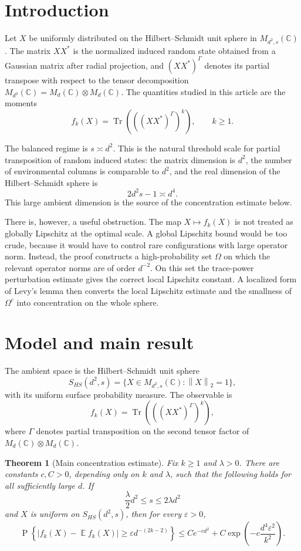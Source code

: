 \documentclass[11pt,reqno]{amsart}
\newtheorem{theorem}{Theorem}[section]
\newcommand{\norm}[1]{\left\lVert#1\right\rVert}
\def\C{\mathbb{C}}
\DeclareMathOperator{\Tr}{Tr}
\DeclareMathOperator{\E}{\mathbb{E}}
\DeclareMathOperator{\Prob}{P}
\newenvironment{revderived}{\begingroup\color{RevisionDerived}}{\endgroup}
\begin{document}
\begin{revderived}
\section{Introduction}

Let \(X\) be uniformly distributed on the Hilbert--Schmidt unit sphere in
\(M_{d^2,s}(\C)\).  The matrix \(XX^*\) is the normalized induced random
state obtained from a Gaussian matrix after radial projection, and
\((XX^*)^\Gamma\) denotes its partial transpose with respect to the tensor
decomposition \(M_{d^2}(\C)=M_d(\C)\otimes M_d(\C)\).  The quantities studied
in this article are the moments
\[
  f_k(X)=\Tr\left(((XX^*)^\Gamma)^k\right),
  \qquad k\ge1.
\]

The balanced regime is \(s\asymp d^2\).  This is the natural threshold scale
for partial transposition of random induced states: the matrix dimension is
\(d^2\), the number of environmental columns is comparable to \(d^2\), and the
real dimension of the Hilbert--Schmidt sphere is
\[
  2d^2s-1\asymp d^4.
\]
This large ambient dimension is the source of the concentration estimate
below.

There is, however, a useful obstruction.  The map \(X\mapsto f_k(X)\) is not
treated as globally Lipschitz at the optimal scale.  A global Lipschitz bound
would be too crude, because it would have to control rare configurations with
large operator norm.  Instead, the proof constructs a high-probability set
\(\Omega\) on which the relevant operator norms are of order \(d^{-2}\).  On
this set the trace-power perturbation estimate gives the correct local
Lipschitz constant.  A localized form of Levy's lemma then converts the local
Lipschitz estimate and the smallness of \(\Omega^c\) into concentration on the
whole sphere.

\section{Model and main result}

The ambient space is the Hilbert--Schmidt unit sphere
\[
  S_{HS}(d^2,s)
  =
  \{X\in M_{d^2,s}(\C):\norm X_2=1\},
\]
with its uniform surface probability measure.  The observable is
\[
  f_k(X)=\Tr\left(((XX^*)^\Gamma)^k\right),
\]
where \(\Gamma\) denotes partial transposition on the second tensor factor of
\(M_d(\C)\otimes M_d(\C)\).

\begin{theorem}[Main concentration estimate]
\label{thm:main-concentration}
Fix \(k\ge1\) and \(\lambda>0\).  There are constants \(c,C>0\), depending
only on \(k\) and \(\lambda\), such that the following holds for all
sufficiently large \(d\).  If
\[
  \frac{\lambda}{2}d^2\le s\le 2\lambda d^2
\]
and \(X\) is uniform on \(S_{HS}(d^2,s)\), then for every \(\varepsilon>0\),
\[
  \Prob\left\{
    \left|
      f_k(X)-\E f_k(X)
    \right|
    \ge
    \varepsilon d^{-(2k-2)}
  \right\}
  \le
  C e^{-c d^2}
  +
  C\exp\left(-c\frac{d^4\varepsilon^2}{k^2}\right).
\]
\end{theorem}


\end{revderived}
\end{document}
